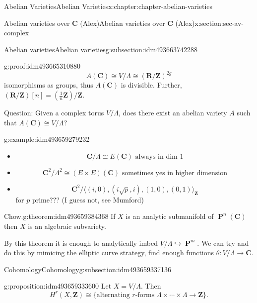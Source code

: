 \documentclass[oneside,10pt,]{book}
\numberwithin{equation}{section}
\newcommand{\lb}{[}
\newcommand{\rb}{]}
\newcommand{\ZZ}{\mathbf{Z}}
\newcommand{\RR}{\mathbf{R}}
\newcommand{\CC}{\mathbf{C}}
\DeclareMathOperator{\PP}{\mathbf{P}}
\begin{document}
\begin{chapterptx}{Abelian Varieties}{}{Abelian Varieties}{}{}{x:chapter:chapter-abelian-varieties}
\begin{sectionptx}{Abelian varieties over \(\CC\) (Alex)}{}{Abelian varieties over \(\CC\) (Alex)}{}{}{x:section:sec-av-complex}
\begin{subsectionptx}{Abelian varieties}{}{Abelian varieties}{}{}{g:subsection:idm493663742288}
\begin{proofptx}{}{g:proof:idm493665310880}
%
\begin{equation*}
A(\CC)  \cong V/\Lambda \cong (\RR/\ZZ)^{2g}
\end{equation*}
isomorphisms as groups, thus \(A(\CC)\) is divisible. Further, \((\RR/\ZZ)\lb n \rb = (\frac 1n \ZZ)/\ZZ\).%
\end{proofptx}
Question: Given a complex torus \(V/\Lambda\), does there exist an abelian variety \(A\) such that \(A(\CC) \cong V/\Lambda\)?%
\begin{example}{}{g:example:idm493659279232}%
%
\begin{itemize}[label=\textbullet]
\item{}%
\begin{equation*}
\CC/\Lambda \cong E(\CC) \text{ always in dim 1}
\end{equation*}
%
\item{}%
\begin{equation*}
\CC^2/\Lambda^2 \cong (E\times E)(\CC) \text{ sometimes yes in higher dimension}
\end{equation*}
%
\item{}%
\begin{equation*}
\CC^2/\langle (i, 0), (i\sqrt p, i), (1, 0), (0, 1)\rangle_\ZZ
\end{equation*}
for \(p\) prime??? (I guess not, see Mumford)%
\end{itemize}
%
\end{example}
\begin{theorem}{Chow.}{}{g:theorem:idm493659384368}%
If \(X\) is an analytic submanifold of \(\PP^n(\CC)\) then \(X\) is an algebraic subvariety.%
\end{theorem}
By this theorem it is enough to analytically imbed \(V/\Lambda \hookrightarrow \PP^m\). We can try and do this by mimicing the elliptic curve strategy, find enough functions \(\theta \colon V/\Lambda \to \CC\).%
\end{subsectionptx}
%
%
\typeout{************************************************}
\typeout{************************************************}
%
\begin{subsectionptx}{Cohomology}{}{Cohomology}{}{}{g:subsection:idm493659337136}
\begin{proposition}{}{}{g:proposition:idm493659333600}%
Let \(X = V/\Lambda\). Then%
\begin{equation*}
H^r (X,\ZZ) \cong \{\text{alternating }r\text{-forms } \Lambda\times\cdots\times\Lambda\to \ZZ\}\text{.}
\end{equation*}

\end{proposition}
\end{subsectionptx}
\end{sectionptx}
\end{chapterptx}
\end{document}
